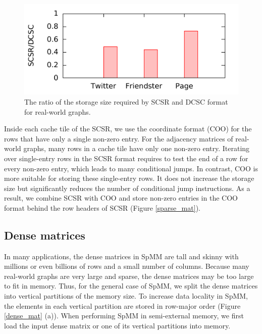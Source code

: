 \begin{figure}
	\begin{center}
		\footnotesize
		\includegraphics[scale=1]{SpMM_figs/storage.pdf}
		\caption{The ratio of the storage size required by SCSR and DCSC
		\cite{Buluc08} format for real-world graphs.}
		\label{fig:storage}
	\end{center}
\end{figure}

Inside each cache tile of the SCSR, we use the coordinate format (COO) for
the rows that have only a single non-zero entry. For the adjacency matrices of
real-world graphs, many rows in a cache tile have only one non-zero entry.
Iterating over single-entry rows in the SCSR format requires to test
the end of a row for every non-zero entry, which leads to many conditional jumps.
In contrast, COO is more suitable for storing these
single-entry rows. It does not increase the storage size but significantly
reduces the number of conditional jump instructions. As a result, we combine
SCSR with COO and store non-zero entries in the COO format behind the row headers
of SCSR (Figure \ref{sparse_mat}).


\subsection{Dense matrices}
In many applications, the dense matrices in SpMM are tall and skinny with
millions or even billions of rows and a small number of columns.
Because many real-world graphs
are very large and sparse, the dense matrices may be too large to fit in memory.
Thus, for the general case of SpMM, we split the dense matrices into vertical
partitions of the memory size. To increase data locality in SpMM, the elements
in each vertical partition are stored in row-major order (Figure \ref{dense_mat}
(a)).  When performing SpMM in semi-external memory, we first load the input dense
matrix or one of its vertical partitions into memory. 

